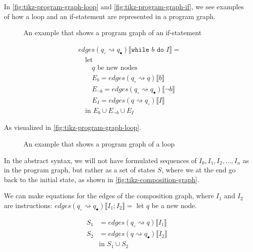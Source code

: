 In \autoref{fig:tikz-program-graph-loop} and \autoref{fig:tikz-program-graph-if}, we see examples of how a loop and an if-statement are represented in a program graph.


\begin{figure}[htb!]
    \center
    
    \caption{An example that shows a program graph of an if-statement}
    \label{fig:tikz-program-graph-if}
\end{figure}

\begin{equation}
\begin{aligned}
    &edges(q_\circ \rightsquigarrow q_\bullet) \llbracket \texttt{while } b \texttt{ do } I \rrbracket = \\
    &\quad \text{let } \\
    &\quad\quad q \text{ be new nodes} \\
    &\quad\quad E_{b} = edges(q_\circ \rightsquigarrow q) \llbracket b \rrbracket \\
    &\quad\quad E_{\neg b} = edges(q_\circ \rightsquigarrow q_\bullet) \llbracket \neg b \rrbracket \\
    &\quad\quad E_{I} = edges(q \rightsquigarrow q_\circ) \llbracket I \rrbracket \\
    &\quad \text{in } E_{b} \cup E_{\neg b} \cup E_{I}
\end{aligned}
\end{equation}

As visualized in \autoref{fig:tikz-program-graph-loop}.

\begin{figure}[htb!]
    \center
    
    \caption{An example that shows a program graph of a loop}
    \label{fig:tikz-program-graph-loop}
\end{figure}


In the abstract syntax, we will not have formulated sequences of $I_0, I_1, I_2, \dots, I_n$ as in the program graph, but rather as a set of states $S$, where we at the end go back to the initial state, as shown in \autoref{fig:tikz-composition-graph}.

We can make equations for the edges of the composition graph, where $I_1$ and $I_2$ are instructions:
$edges(q_{\circ} \rightsquigarrow q_{\bullet})\llbracket I_1 ; I_2 \rrbracket = $ let $q$ be a new node.


\begin{align}
    S_1 &= edges(q_{\circ} \rightsquigarrow q)\llbracket I_1 \rrbracket \\
    S_2 &= edges(q \rightsquigarrow q_{\bullet})\llbracket I_2 \rrbracket \\
    &\text{in } S_1 \cup S_2
\end{align}


